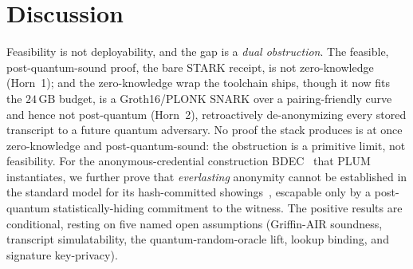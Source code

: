 \section{Discussion}
Feasibility is not deployability, and the gap is a \emph{dual obstruction}. The feasible, post-quantum-sound proof, the bare STARK receipt, is not zero-knowledge (Horn~1); and the zero-knowledge wrap the toolchain ships, though it now fits the $24\,\mathrm{GB}$ budget, is a Groth16/PLONK SNARK over a pairing-friendly curve and hence not post-quantum (Horn~2), retroactively de-anonymizing every stored transcript to a future quantum adversary. No proof the stack produces is at once zero-knowledge and post-quantum-sound: the obstruction is a primitive limit, not feasibility. For the anonymous-credential construction BDEC~\cite{10.1007/978-981-96-0957-4_3} that PLUM instantiates, we further prove that \emph{everlasting} anonymity cannot be established in the standard model for its hash-committed showings~\cite{cgh2004rom}, escapable only by a post-quantum statistically-hiding commitment to the witness. The positive results are conditional, resting on five named open assumptions (Griffin-AIR soundness, transcript simulatability, the quantum-random-oracle lift, lookup binding, and signature key-privacy).
